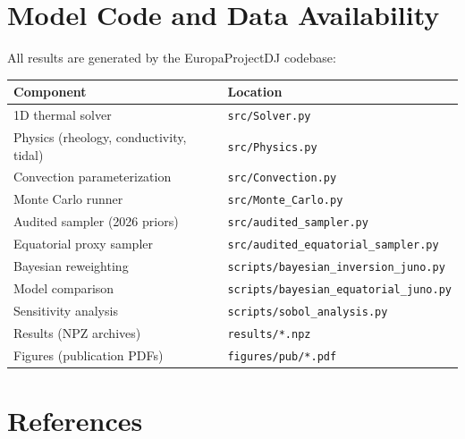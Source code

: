 \documentclass[11pt,letterpaper]{article}
\begin{document}
\section{Model Code and Data Availability}
\label{app:code}

All results are generated by the EuropaProjectDJ codebase:

\begin{table}[htbp]
\centering
\small
\begin{tabular}{@{}ll@{}}
\toprule
\textbf{Component} & \textbf{Location} \\
\midrule
1D thermal solver & \texttt{src/Solver.py} \\
Physics (rheology, conductivity, tidal) & \texttt{src/Physics.py} \\
Convection parameterization & \texttt{src/Convection.py} \\
Monte Carlo runner & \texttt{src/Monte\_Carlo.py} \\
Audited sampler (2026 priors) & \texttt{src/audited\_sampler.py} \\
Equatorial proxy sampler & \texttt{src/audited\_equatorial\_sampler.py} \\
Bayesian reweighting & \texttt{scripts/bayesian\_inversion\_juno.py} \\
Model comparison & \texttt{scripts/bayesian\_equatorial\_juno.py} \\
Sensitivity analysis & \texttt{scripts/sobol\_analysis.py} \\
Results (NPZ archives) & \texttt{results/*.npz} \\
Figures (publication PDFs) & \texttt{figures/pub/*.pdf} \\
\bottomrule
\end{tabular}
\end{table}


\newpage
\section*{References}
\end{document}
